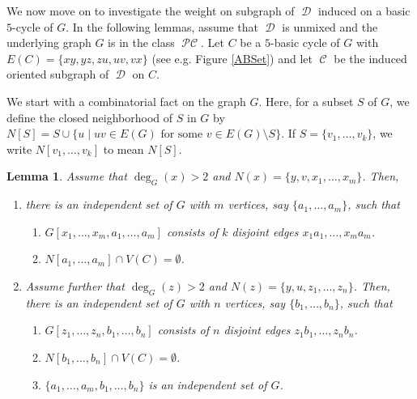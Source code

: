 \documentclass[12pt, amscd]{amsart}
\newtheorem{lem}[thm]{Lemma}
\theoremstyle{definition}
\DeclareMathOperator{\pc}{\mathcal{PC}}
\DeclareMathOperator{\D}{\mathcal{D}}
\DeclareMathOperator{\C}{\mathcal{C}}
\newcommand{\0}{\bold{0}}
\begin{document}
\medskip

We now move on to investigate the weight on subgraph of $\D$ induced on a basic $5$-cycle of $G$. In the following lemmas, assume that $\D$ is unmixed and the underlying graph $G$ is in the class $\pc$. Let $C$ be a $5$-basic cycle of $G$ with $E(C) = \{xy,yz,zu,uv,vx\}$ (see e.g. Figure \ref{ABSet}) and let $\C$ be the induced oriented subgraph of $\D$ on $C$. 

\medskip

We start with a combinatorial fact on the graph $G$. Here, for a subset $S$ of $G$, we define the closed neighborhood of $S$ in $G$ by
$N[S] = S \cup \{u \mid uv\in E(G) \text{ for some } v \in E(G)\setminus S\}$. If $S=\{v_1,\ldots,v_k\}$, we write $N[v_1,\ldots,v_k]$ to mean $N[S]$.

\begin{lem}\label{CM-L02}  Assume that $\deg_G(x)>2$ and $N(x) = \{y,v,x_1,\ldots,x_m\}$.  Then, 
\begin{enumerate}
\item there is an independent set of $G$ with $m$ vertices,  say $\{a_1,\ldots,a_m\}$,  such that
\begin{enumerate}
\item $G[x_1,\ldots,x_m,a_1,\ldots,a_m]$ consists of $k$ disjoint edges $x_1a_1, \ldots, x_m a_m$.
\item $N[a_1,\ldots,a_m] \cap V(C) = \emptyset$.
\end{enumerate}
\item Assume further that $\deg_G(z) > 2$ and $N(z) = \{y,u,z_1,\ldots,z_n\}$. Then, there is an independent set of $G$ with $n$ vertices,  say $\{b_1,\ldots,b_n\}$,  such that
\begin{enumerate}
\item $G[z_1,\ldots,z_n,b_1,\ldots,b_n]$ consists of $n$ disjoint edges $z_1b_1, \ldots, z_n b_n$.
\item $N[b_1,\ldots,b_n] \cap V(C) = \emptyset$.
\item $\{a_1,\ldots,a_m,b_1,\ldots,b_n\}$ is an independent set of $G$.
\end{enumerate}
\end{enumerate}
\end{lem}
\end{document}
